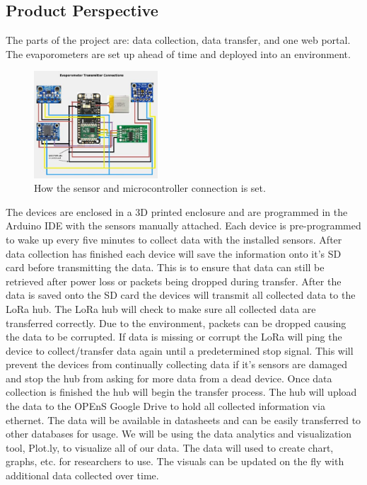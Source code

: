 \documentclass[onecolumn, draftclsnofoot,10pt, compsoc]{IEEEtran}
\begin{document}
\subsection{Product Perspective}
The parts of the project are: data collection, data transfer, and one web portal.  The evaporometers are set up ahead of time and deployed into an environment.
\newline
\begin{figure}
 \caption{How the sensor and microcontroller connection is set.}
\includegraphics[height=4cm]{connections.eps}
\end{figure}
\newline
The devices are enclosed in a 3D printed enclosure and are programmed in the Arduino IDE with the sensors manually attached.  Each device is pre-programmed to wake up every five minutes to collect data with the installed sensors.  After data collection has finished each device will save the information onto it’s SD card before transmitting the data.  This is to ensure that data can still be retrieved after power loss or packets being dropped during transfer.
\newline
After the data is saved onto the SD card the devices will transmit all collected data to the LoRa hub.  The LoRa hub will check to make sure all collected data are transferred correctly.  Due to the environment, packets can be dropped causing the data to be corrupted.  If data is missing or corrupt the LoRa will ping the device to collect/transfer data again until a predetermined stop signal.  This will prevent the devices from continually collecting data if it’s sensors are damaged and stop the hub from asking for more data from a dead device.
\newline
Once data collection is finished the hub will begin the transfer process.  The hub will upload the data to the OPEnS Google Drive to hold all collected information via ethernet.  The data will be available in datasheets and can be easily transferred to other databases for usage.
\newline
We will be using the data analytics and visualization tool, Plot.ly, to visualize all of our data.  The data will used to create chart, graphs, etc. for researchers to use.  The visuals can be updated on the fly with additional data collected over time.
\end{document}
